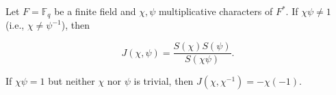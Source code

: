 Let $F = \mathbb{F}_q$ be a finite field and $\chi, \psi$ multiplicative characters of $F^*$. If $\chi\psi \neq 1$ (i.e., $\chi \neq \psi^{-1}$), then

$$J(\chi, \psi) = \frac{S(\chi) S(\psi)}{S(\chi\psi)}.$$

If $\chi\psi = 1$ but neither $\chi$ nor $\psi$ is trivial, then $J(\chi, \chi^{-1}) = -\chi(-1)$.
